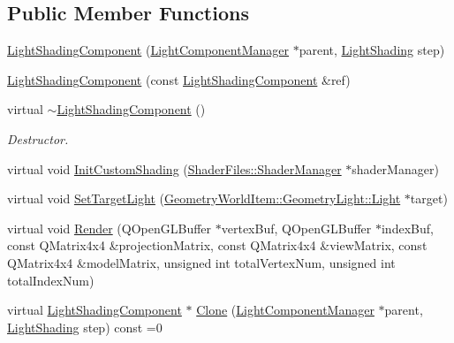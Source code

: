 \subsection*{Public Member Functions}
\begin{DoxyCompactItemize}
\item 
\mbox{\hyperlink{class_geometry_engine_1_1_light_utils_1_1_light_shading_component_a70c7751d6162e5fe224079eb1c4337da}{Light\+Shading\+Component}} (\mbox{\hyperlink{class_geometry_engine_1_1_light_utils_1_1_light_component_manager}{Light\+Component\+Manager}} $\ast$parent, \mbox{\hyperlink{namespace_geometry_engine_1_1_light_utils_a16eb370137c2fd151e6f8e1d07cd23e0}{Light\+Shading}} step)
\item 
\mbox{\hyperlink{class_geometry_engine_1_1_light_utils_1_1_light_shading_component_a7de2f38f87aca7cc7cca49a09009098b}{Light\+Shading\+Component}} (const \mbox{\hyperlink{class_geometry_engine_1_1_light_utils_1_1_light_shading_component}{Light\+Shading\+Component}} \&ref)
\item 
\mbox{\label{class_geometry_engine_1_1_light_utils_1_1_light_shading_component_a42a9f0472172896d638fe5ca842bde10}} 
virtual \mbox{\hyperlink{class_geometry_engine_1_1_light_utils_1_1_light_shading_component_a42a9f0472172896d638fe5ca842bde10}{$\sim$\+Light\+Shading\+Component}} ()
\begin{DoxyCompactList}\small\item\em Destructor. \end{DoxyCompactList}\item 
virtual void \mbox{\hyperlink{class_geometry_engine_1_1_light_utils_1_1_light_shading_component_a481338e8a564f895b895b3234569df58}{Init\+Custom\+Shading}} (\mbox{\hyperlink{class_shader_files_1_1_shader_manager}{Shader\+Files\+::\+Shader\+Manager}} $\ast$shader\+Manager)
\item 
virtual void \mbox{\hyperlink{class_geometry_engine_1_1_light_utils_1_1_light_shading_component_aa2e50470089c2d17b76dd18bdf1a1a68}{Set\+Target\+Light}} (\mbox{\hyperlink{class_geometry_engine_1_1_geometry_world_item_1_1_geometry_light_1_1_light}{Geometry\+World\+Item\+::\+Geometry\+Light\+::\+Light}} $\ast$target)
\item 
virtual void \mbox{\hyperlink{class_geometry_engine_1_1_light_utils_1_1_light_shading_component_abc803db0e608a80310bd8dea92997e0f}{Render}} (Q\+Open\+G\+L\+Buffer $\ast$vertex\+Buf, Q\+Open\+G\+L\+Buffer $\ast$index\+Buf, const Q\+Matrix4x4 \&projection\+Matrix, const Q\+Matrix4x4 \&view\+Matrix, const Q\+Matrix4x4 \&model\+Matrix, unsigned int total\+Vertex\+Num, unsigned int total\+Index\+Num)
\item 
virtual \mbox{\hyperlink{class_geometry_engine_1_1_light_utils_1_1_light_shading_component}{Light\+Shading\+Component}} $\ast$ \mbox{\hyperlink{class_geometry_engine_1_1_light_utils_1_1_light_shading_component_a8f2107f451b130b6f4e7042cafbc8210}{Clone}} (\mbox{\hyperlink{class_geometry_engine_1_1_light_utils_1_1_light_component_manager}{Light\+Component\+Manager}} $\ast$parent, \mbox{\hyperlink{namespace_geometry_engine_1_1_light_utils_a16eb370137c2fd151e6f8e1d07cd23e0}{Light\+Shading}} step) const =0
\end{DoxyCompactItemize}
